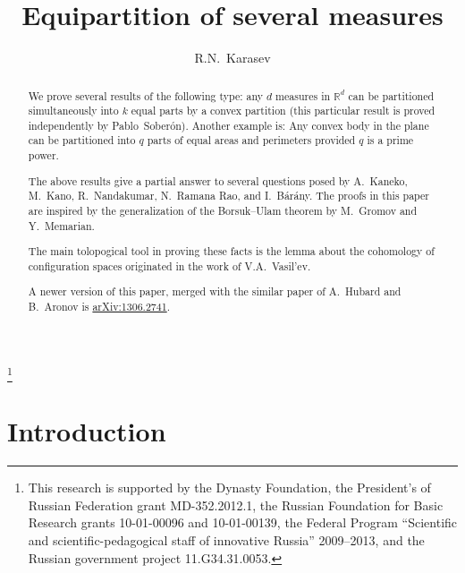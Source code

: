 \documentclass[12pt,a4paper,oneside]{amsart}
\theoremstyle{definition}
\theoremstyle{remark}
\numberwithin{equation}{section}
\begin{document}
\title{Equipartition of several measures}
\author{R.N.~Karasev}
\thanks{This research is supported by the Dynasty Foundation, the President's of Russian Federation grant MD-352.2012.1, the Russian Foundation for Basic Research grants 10-01-00096 and 10-01-00139, the Federal Program ``Scientific and scientific-pedagogical staff of innovative Russia'' 2009--2013, and the Russian government project 11.G34.31.0053.}

\address{Dept. of Mathematics, Moscow Institute of Physics and Technology, Institutskiy per. 9, Dolgoprudny, Russia 141700}
\address{Institute for Information Transmission Problems RAS, Bolshoy Karetny per. 19, Moscow, Russia 127994}
\address{Laboratory of Discrete and Computational Geometry, Yaroslavl' State University, Sovetskaya st. 14, Yaroslavl', Russia 150000}


\begin{abstract}
We prove several results of the following type: any $d$ measures in $\mathbb R^d$ can be partitioned simultaneously into $k$ equal parts by a convex partition (this particular result is proved independently by Pablo~Sober\'on). Another example is: Any convex body in the plane can be partitioned into $q$ parts of equal areas and perimeters provided $q$ is a prime power.

The above results give a partial answer to several questions posed by A.~Kaneko, M.~Kano, R.~Nandakumar, N.~Ramana Rao, and I.~B\'{a}r\'{a}ny. The proofs in this paper are inspired by the generalization of the Borsuk--Ulam theorem by M.~Gromov and Y.~Memarian.

The main tolopogical tool in proving these facts is the lemma about the cohomology of configuration spaces originated in the work of V.A.~Vasil'ev.

A newer version of this paper, merged with the similar paper of A.~Hubard and B.~Aronov is \href{http://arxiv.org/abs/1306.2741}{arXiv:1306.2741}.
\end{abstract}

\maketitle

\section{Introduction}
\end{document}
